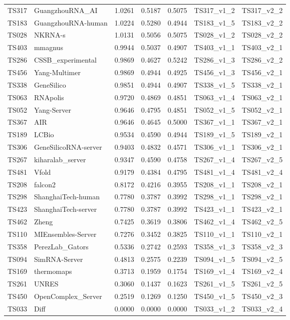 \begin{table}[ht]
{\begin{tabular}{llrrrll}
TS317 & GuangzhouRNA\_AI & 1.0261 & 0.5187 & 0.5075 & TS317\_v1\_2 & TS317\_v2\_2 \\ 
TS183 & GuangzhouRNA-human & 1.0224 & 0.5280 & 0.4944 & TS183\_v1\_5 & TS183\_v2\_2 \\ 
TS028 & NKRNA-s & 1.0131 & 0.5056 & 0.5075 & TS028\_v1\_2 & TS028\_v2\_2 \\ 
TS403 & mmagnus & 0.9944 & 0.5037 & 0.4907 & TS403\_v1\_1 & TS403\_v2\_1 \\ 
TS286 & CSSB\_experimental & 0.9869 & 0.4627 & 0.5242 & TS286\_v1\_3 & TS286\_v2\_2 \\ 
TS456 & Yang-Multimer & 0.9869 & 0.4944 & 0.4925 & TS456\_v1\_3 & TS456\_v2\_1 \\ 
TS338 & GeneSilico & 0.9851 & 0.4944 & 0.4907 & TS338\_v1\_5 & TS338\_v2\_1 \\ 
TS063 & RNApolis & 0.9720 & 0.4869 & 0.4851 & TS063\_v1\_4 & TS063\_v2\_1 \\ 
TS052 & Yang-Server & 0.9646 & 0.4795 & 0.4851 & TS052\_v1\_5 & TS052\_v2\_1 \\ 
TS367 & AIR & 0.9646 & 0.4645 & 0.5000 & TS367\_v1\_1 & TS367\_v2\_1 \\ 
TS189 & LCBio & 0.9534 & 0.4590 & 0.4944 & TS189\_v1\_5 & TS189\_v2\_1 \\ 
TS306 & GeneSilicoRNA-server & 0.9403 & 0.4832 & 0.4571 & TS306\_v1\_1 & TS306\_v2\_1 \\ 
TS267 & kiharalab\_server & 0.9347 & 0.4590 & 0.4758 & TS267\_v1\_4 & TS267\_v2\_5 \\ 
TS481 & Vfold & 0.9179 & 0.4384 & 0.4795 & TS481\_v1\_4 & TS481\_v2\_4 \\ 
TS208 & falcon2 & 0.8172 & 0.4216 & 0.3955 & TS208\_v1\_1 & TS208\_v2\_1 \\ 
TS298 & ShanghaiTech-human & 0.7780 & 0.3787 & 0.3992 & TS298\_v1\_1 & TS298\_v2\_1 \\ 
TS423 & ShanghaiTech-server & 0.7780 & 0.3787 & 0.3992 & TS423\_v1\_1 & TS423\_v2\_1 \\ 
TS462 & Zheng & 0.7425 & 0.3619 & 0.3806 & TS462\_v1\_4 & TS462\_v2\_5 \\ 
TS110 & MIEnsembles-Server & 0.7276 & 0.3452 & 0.3825 & TS110\_v1\_1 & TS110\_v2\_1 \\ 
TS358 & PerezLab\_Gators & 0.5336 & 0.2742 & 0.2593 & TS358\_v1\_3 & TS358\_v2\_3 \\ 
TS094 & SimRNA-Server & 0.4813 & 0.2575 & 0.2239 & TS094\_v1\_5 & TS094\_v2\_5 \\ 
TS169 & thermomaps & 0.3713 & 0.1959 & 0.1754 & TS169\_v1\_4 & TS169\_v2\_4 \\ 
TS261 & UNRES & 0.3060 & 0.1437 & 0.1623 & TS261\_v1\_5 & TS261\_v2\_5 \\ 
TS450 & OpenComplex\_Server & 0.2519 & 0.1269 & 0.1250 & TS450\_v1\_5 & TS450\_v2\_3 \\ 
TS033 & Diff & 0.0000 & 0.0000 & 0.0000 & TS033\_v1\_2 & TS033\_v2\_4 \\ 
\bottomrule
\end{tabular}%
}
\end{table}
